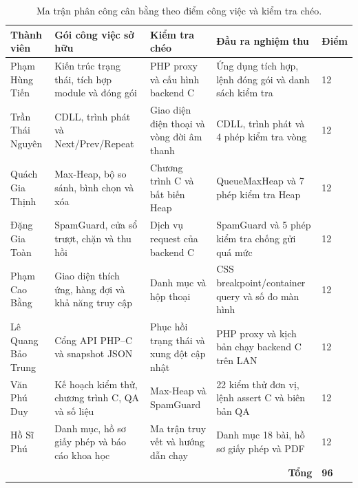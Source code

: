 \documentclass[12pt,a4paper,twoside,openright]{report}
\begin{document}
\begin{table}[H]\centering\footnotesize
\begin{tabularx}{\textwidth}{@{}p{2.5cm}p{4.1cm}p{3.45cm}Xp{1.15cm}@{}}
\toprule
\textbf{Thành viên} & \textbf{Gói công việc sở hữu} & \textbf{Kiểm tra chéo} &
\textbf{Đầu ra nghiệm thu} & \textbf{Điểm}\\
\midrule
Phạm Hùng Tiến & Kiến trúc trạng thái, tích hợp module và đóng gói & PHP proxy và cấu hình backend C & Ứng dụng tích hợp, lệnh đóng gói và danh sách kiểm tra & 12\\
Trần Thái Nguyên & CDLL, trình phát và Next/Prev/Repeat & Giao diện điện thoại và vòng đời âm thanh & CDLL, trình phát và 4 phép kiểm tra vòng & 12\\
Quách Gia Thịnh & Max-Heap, bộ so sánh, bình chọn và xóa & Chương trình C và bất biến Heap & QueueMaxHeap và 7 phép kiểm tra Heap & 12\\
Đặng Gia Toàn & SpamGuard, cửa sổ trượt, chặn và thu hồi & Dịch vụ request của backend C & SpamGuard và 5 phép kiểm tra chống gửi quá mức & 12\\
Phạm Cao Bằng & Giao diện thích ứng, hàng đợi và khả năng truy cập & Danh mục và hộp thoại & CSS breakpoint/container query và số đo màn hình & 12\\
Lê Quang Bảo Trung & Cổng API PHP--C và snapshot JSON & Phục hồi trạng thái và xung đột cập nhật & PHP proxy và kịch bản chạy backend C trên LAN & 12\\
Văn Phú Duy & Kế hoạch kiểm thử, chương trình C, QA và số liệu & Max-Heap và SpamGuard & 22 kiểm thử đơn vị, lệnh assert C và biên bản QA & 12\\
Hồ Sĩ Phú & Danh mục, hồ sơ giấy phép và báo cáo khoa học & Ma trận truy vết và hướng dẫn chạy & Danh mục 18 bài, hồ sơ giấy phép và PDF & 12\\
\midrule
\multicolumn{4}{r}{\textbf{Tổng}} & \textbf{96}\\
\bottomrule
\end{tabularx}
\caption{Ma trận phân công cân bằng theo điểm công việc và kiểm tra chéo.}
\label{tab:balanced-work}
\end{table}
\end{document}
